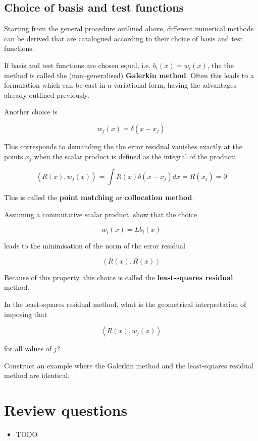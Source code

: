 \subsection{Choice of basis and test functions}

Starting from the general procedure outlined above, different numerical methods can be derived that are catalogued according to their choice of basis and test functions.

If basis and test functions are chosen equal, i.e. $b_i(x) = w_i(x)$, the the method is called the (non--generalised) \textbf{Galerkin method}. Often this leads to a formulation which can be cast in a variational form, having the advantages already outlined previously.

Another choice is

\begin{equation}
w_j(x) = \delta(x-x_j)
\end{equation} 

This corresponds to demanding the the error residual vanishes exactly at the points $x_j$ when the scalar product is defined as the integral of the product:

\begin{equation}
\left\langle R(x), w_j(x) \right\rangle = \int R(x) \delta(x-x_j) dx = R(x_j) = 0
\end{equation} 

This is called the \textbf{point matching} or \textbf{collocation method}.


\begin{exer}
Assuming a commutative scalar product, show that the choice 

$$w_i(x) = L b_i(x)$$

leads to the minimisation of the norm of the error residual 

$$\left\langle R(x), R(x) \right\rangle$$ 

Because of this property, this choice is called the \textbf{least-squares residual} method.
\end{exer}



\begin{exer}
In the least-squares residual method, what is the geometrical interpretation of imposing that 

$$\left\langle R(x), w_j(x) \right\rangle$$ 

for all values of $j$?
\end{exer}



\begin{exer}
Construct an example where the Galerkin method and the least-squares residual method are identical.
\end{exer}



\section*{Review questions}

\begin{itemize}
\item TODO
\end{itemize}

